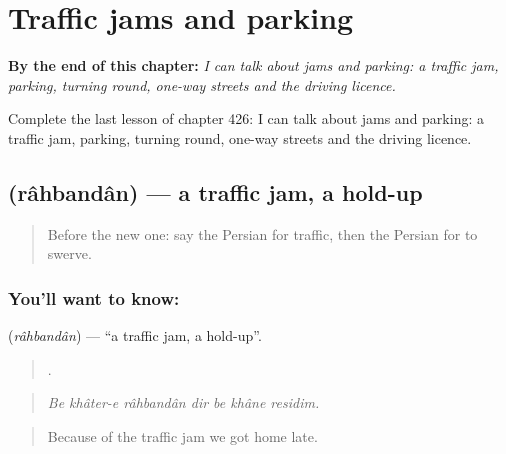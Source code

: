 
\chapter{Traffic jams and parking}
\label{ch:fa-traffic-jams-and-parking}

\begin{chapteropening}
\textbf{By the end of this chapter:} \emph{I can talk about jams and parking: a traffic jam, parking, turning round, one-way streets and the driving licence.}

Complete the last lesson of chapter 426: I can talk about jams and parking: a traffic jam, parking, turning round, one-way streets and the driving licence.
\end{chapteropening}

\section[\texorpdfstring{\fa{راهبندان} (râhbandân)}{راهبندان (râhbandân)}]{ (râhbandân) — a traffic jam, a hold-up}

\label{lesson:FA-C426-rahbandan}



\begin{quote}
Before the new one: say the Persian for traffic, then the Persian for to swerve.
\end{quote}

\subsection*{You'll want to know: }
\textbf{} (\emph{râhbandân}) — \textquotedblleft{}a traffic jam, a hold-up\textquotedblright{}.

\begin{quote}
      .
\end{quote}

\begin{quote}
\emph{Be khâter-e râhbandân dir be khâne residim.}
\end{quote}

\begin{quote}
Because of the traffic jam we got home late.
\end{quote}

